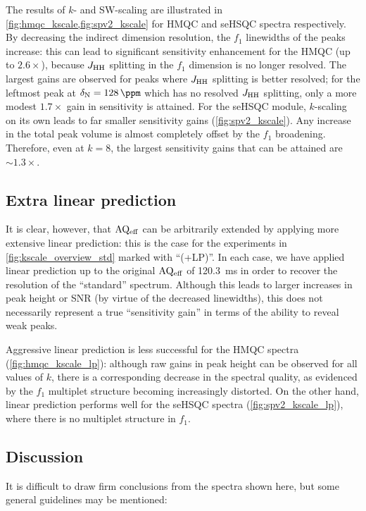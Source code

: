 The results of $k$- and SW-scaling are illustrated in \cref{fig:hmqc_kscale,fig:spv2_kscale} for \nitrogen{} HMQC and seHSQC spectra respectively.
By decreasing the indirect dimension resolution, the $f_1$ linewidths of the peaks increase: this can lead to significant sensitivity enhancement for the HMQC (up to $2.6 \times$), because $\jhh$ splitting in the $f_1$ dimension is no longer resolved.
The largest gains are observed for peaks where $\jhh$ splitting is better resolved; for the leftmost peak at $\delta_{\ce{N}} = \SI{128}{\ppm}$ which has no resolved $\jhh$ splitting, only a more modest $1.7 \times$ gain in sensitivity is attained.
For the seHSQC module, $k$-scaling on its own leads to far smaller sensitivity gains (\cref{fig:spv2_kscale}).
Any increase in the total peak volume is almost completely offset by the $f_1$ broadening.
Therefore, even at $k = 8$, the largest sensitivity gains that can be attained are $\sim 1.3\times$.

\subsection{Extra linear prediction}

It is clear, however, that $\mathrm{AQ_{eff}}$ can be arbitrarily extended by applying more extensive linear prediction: this is the case for the experiments in \cref{fig:kscale_overview_std} marked with ``(+LP)''.
In each case, we have applied linear prediction up to the original $\mathrm{AQ_{eff}}$ of \SI{120.3}{\ms} in order to recover the resolution of the ``standard'' spectrum.
Although this leads to larger increases in peak height or SNR (by virtue of the decreased linewidths), this does not necessarily represent a true ``sensitivity gain'' in terms of the ability to reveal weak peaks.\autocite{snrsens}

Aggressive linear prediction is less successful for the HMQC spectra (\cref{fig:hmqc_kscale_lp}): although raw gains in peak height can be observed for all values of $k$, there is a corresponding decrease in the spectral quality, as evidenced by the $f_1$ multiplet structure becoming increasingly distorted.
On the other hand, linear prediction performs well for the seHSQC spectra (\cref{fig:spv2_kscale_lp}), where there is no multiplet structure in $f_1$.


\subsection{Discussion}

It is difficult to draw firm conclusions from the spectra shown here, but some general guidelines may be mentioned:

